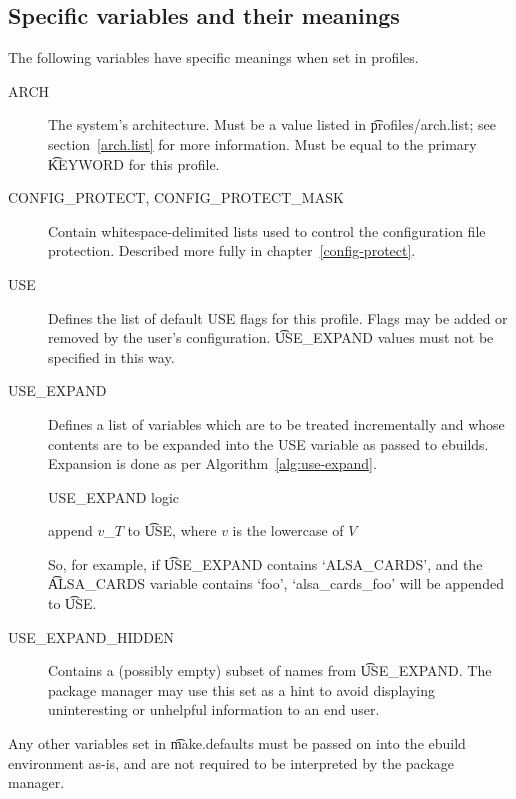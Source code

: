 \subsection{Specific variables and their meanings}
The following variables have specific meanings when set in profiles.
\begin{description}
\item[ARCH] The system's architecture. Must be a value listed in
  \t{profiles/arch.list}; see section~\ref{arch.list}
  for more information. Must be equal to the primary \t{KEYWORD} for this
  profile.
\item[CONFIG\_PROTECT, CONFIG\_PROTECT\_MASK] Contain whitespace-delimited lists used to control the
    configuration file protection. Described more fully in chapter~\ref{config-protect}.
\item[USE] Defines the list of default USE flags for this profile. Flags may be added or removed by
    the user's configuration. \t{USE\_EXPAND} values must not be specified in this way.
\item[USE\_EXPAND] \label{use-expand} Defines a list of variables which are to be treated
    incrementally and whose contents are to be expanded into the USE variable as passed to ebuilds.
    Expansion is done as per Algorithm~\ref{alg:use-expand}.
    \begin{algorithm}
    \caption{USE\_EXPAND logic} \label{alg:use-expand}
    \begin{algorithmic}
                \STATE append $v$\_$T$ to \t{USE}, where $v$ is the lowercase of $V$
            \ENDFOR
        \ENDFOR
    \end{algorithmic}
    \end{algorithm}
    So, for example, if \t{USE\_EXPAND} contains `ALSA\_CARDS', and the \t{ALSA\_CARDS} variable
    contains `foo', `alsa\_cards\_foo' will be appended to \t{USE}.
\item[USE\_EXPAND\_HIDDEN] Contains a (possibly empty) subset of names from \t{USE\_EXPAND}. The
    package manager may use this set as a hint to avoid displaying uninteresting or unhelpful
    information to an end user.
\end{description}

Any other variables set in \t{make.defaults} must be passed on into the ebuild environment as-is,
and are not required to be interpreted by the package manager.


